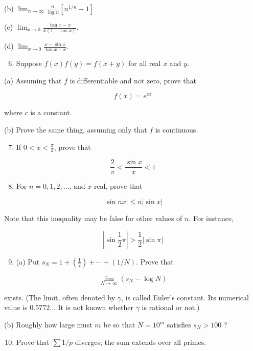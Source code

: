 \documentclass[10pt]{article}
\begin{document}
(b) $\lim _{n \rightarrow \infty} \frac{n}{\log n}\left[n^{1 / n}-1\right]$

(c) $\lim _{x \rightarrow 0} \frac{\tan x-x}{x(1-\cos x)}$.

(d) $\lim _{x \rightarrow 0} \frac{x-\sin x}{\tan x-x}$.

\begin{enumerate}
  \setcounter{enumi}{5}
  \item Suppose $f(x) f(y)=f(x+y)$ for all real $x$ and $y$.
\end{enumerate}

(a) Assuming that $f$ is differentiable and not zero, prove that

$$
f(x)=e^{c x}
$$

where $c$ is a constant.

(b) Prove the same thing, assuming only that $f$ is continuous.

\begin{enumerate}
  \setcounter{enumi}{6}
  \item If $0<x<\frac{\pi}{2}$, prove that
\end{enumerate}

$$
\frac{2}{\pi}<\frac{\sin x}{x}<1
$$

\begin{enumerate}
  \setcounter{enumi}{7}
  \item For $n=0,1,2, \ldots$, and $x$ real, prove that
\end{enumerate}

$$
|\sin n x| \leq n|\sin x|
$$

Note that this inequality may be false for other values of $n$. For instance,

$$
\left|\sin \frac{1}{2} \pi\right|>\frac{1}{2}|\sin \pi|
$$

\begin{enumerate}
  \setcounter{enumi}{8}
  \item (a) Put $s_{N}=1+\left(\frac{1}{2}\right)+\cdots+(1 / N)$. Prove that
\end{enumerate}

$$
\lim _{N \rightarrow \infty}\left(s_{N}-\log N\right)
$$

exists. (The limit, often denoted by $\gamma$, is called Euler's constant. Its numerical value is $0.5772 \ldots$ It is not known whether $\gamma$ is rational or not.)

(b) Roughly how large must $m$ be so that $N=10^{m}$ satisfies $s_{N}>100$ ?

\begin{enumerate}
  \setcounter{enumi}{9}
  \item Prove that $\sum 1 / p$ diverges; the sum extends over all primes.
\end{enumerate}
\end{document}
